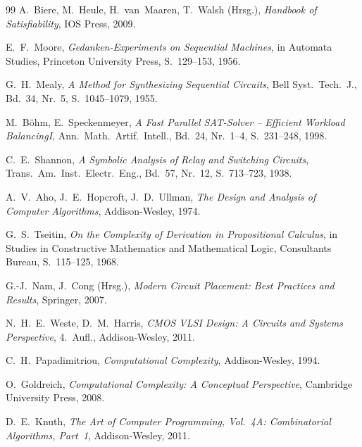 ﻿\documentclass[a4paper,12pt]{article}
\theoremstyle{definition}
\begin{document}
\begin{thebibliography}{99}
A.~Biere, M.~Heule, H.~van~Maaren, T.~Walsh (Hrsg.),
\emph{Handbook of Satisfiability},
IOS Press, 2009.

E.~F.~Moore,
\emph{Gedanken-Experiments on Sequential Machines},
in Automata Studies, Princeton University Press, S.~129--153, 1956.

G.~H.~Mealy,
\emph{A Method for Synthesizing Sequential Circuits},
Bell Syst.~Tech.~J., Bd.~34, Nr.~5, S.~1045--1079, 1955.

M.~Böhm, E.~Speckenmeyer,
\emph{A Fast Parallel SAT-Solver -- Efficient Workload BalancingI},
Ann.~Math.~Artif.~Intell., Bd.~24, Nr.~1--4, S.~231--248, 1998.

C.~E.~Shannon,
\emph{A Symbolic Analysis of Relay and Switching Circuits},
Trans.~Am.~Inst.~Electr.~Eng., Bd.~57, Nr.~12, S.~713--723, 1938.

A.~V.~Aho, J.~E.~Hopcroft, J.~D.~Ullman,
\emph{The Design and Analysis of Computer Algorithms},
Addison-Wesley, 1974.

G.~S.~Tseitin,
\emph{On the Complexity of Derivation in Propositional Calculus},
in Studies in Constructive Mathematics and Mathematical Logic,
Consultants Bureau, S.~115--125, 1968.

G.-J.~Nam, J.~Cong (Hrsg.),
\emph{Modern Circuit Placement: Best Practices and Results},
Springer, 2007.

N.~H.~E.~Weste, D.~M.~Harris,
\emph{CMOS VLSI Design: A Circuits and Systems Perspective},
4.~Aufl., Addison-Wesley, 2011.

C.~H.~Papadimitriou,
\emph{Computational Complexity},
Addison-Wesley, 1994.

O.~Goldreich,
\emph{Computational Complexity: A Conceptual Perspective},
Cambridge University Press, 2008.

D.~E.~Knuth,
\emph{The Art of Computer Programming, Vol.~4A: Combinatorial Algorithms,
Part~1},
Addison-Wesley, 2011.

\end{thebibliography}
\end{document}
